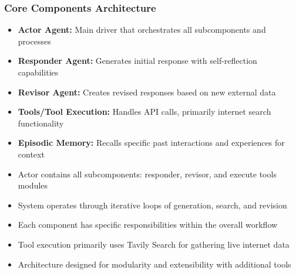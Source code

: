 \begin{frame}[fragile]\frametitle{Core Components Architecture}
      \begin{itemize}
          \item \textbf{Actor Agent:} Main driver that orchestrates all subcomponents and processes
          \item \textbf{Responder Agent:} Generates initial response with self-reflection capabilities
          \item \textbf{Revisor Agent:} Creates revised responses based on new external data
          \item \textbf{Tools/Tool Execution:} Handles API calls, primarily internet search functionality
          \item \textbf{Episodic Memory:} Recalls specific past interactions and experiences for context
          \item Actor contains all subcomponents: responder, revisor, and execute tools modules
          \item System operates through iterative loops of generation, search, and revision
          \item Each component has specific responsibilities within the overall workflow
          \item Tool execution primarily uses Tavily Search for gathering live internet data
          \item Architecture designed for modularity and extensibility with additional tools
      \end{itemize}
\end{frame}

